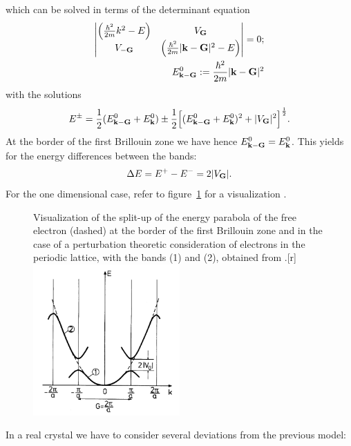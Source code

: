 which can be solved in terms of the determinant equation
\begin{eqnarray}
    \begin{vmatrix}
        \Big(\frac{\hbar^2}{2m} k^2 - E\Big) & V_{\mathbf{G}} \\
        V_\mathbf{-G}   & \Big(\frac{\hbar^2}{2m} |\mathbf{k} - \mathbf{G}|^2 - E\Big) 
    \end{vmatrix} = 0; \\
    E_{\mathbf{k} - \mathbf{G}}^0 := \frac{\hbar^2}{2m} |\mathbf{k} - \mathbf{G}|^2 \nonumber
\end{eqnarray}
with the solutions
\begin{equation}
    E^\pm = 
    \frac{1}{2}(E_{\mathbf{k} - \mathbf{G}}^0 + E_{\mathbf{k}}^0) \pm 
        \frac{1}{2}\Big[(E_{\mathbf{k} - \mathbf{G}}^0 + E_{\mathbf{k}}^0)^2 + |V_{\mathbf{G}}|^2\Big]^{\frac{1}{2}}.
\end{equation}
At the border of the first Brillouin zone we have hence  $E_{\mathbf{k} - \mathbf{G}}^0 = E_{\mathbf{k}}^0$. 
This yields for the energy differences between the bands:
\begin{equation}
    \Delta E = E^+ - E^- = 2 |V_{\mathbf{G}}|.
\end{equation}
For the one dimensional case, refer to figure~\ref{fig:Bloch} for a visualization
\cite{ibach2009festkorperphysik}.
\begin{figure}[!t]
  \begin{captionbeside}[]{
          Visualization of the split-up of the energy parabola of the free electron (dashed)
          at the border of the first Brillouin zone and in the case of a perturbation theoretic
          consideration of electrons in the periodic lattice, with the bands (1) and (2),
obtained from \cite{ibach2009festkorperphysik}.}[r]
    \includegraphics[width=0.5\textwidth]{figures/Bloch}
  \end{captionbeside}
  \label{fig:Bloch}
\end{figure}
In a real crystal we have to consider several deviations from the previous model:
